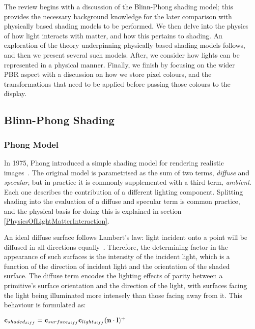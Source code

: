 The review begins with a discussion of the Blinn-Phong shading model; this provides the necessary background knowledge for the later comparison with physically based shading models to be performed. We then delve into the physics of how light interacts with matter, and how this pertains to shading. An exploration of the theory underpinning physically based shading models follows, and then we present several such models. After, we consider how lights can be represented in a physical manner. Finally, we finish by focusing on the wider PBR aspect with a discussion on how we store pixel colours, and the transformations that need to be applied before passing those colours to the display.

\subsection{Blinn-Phong Shading}

\subsubsection{Phong Model}

In 1975, Phong introduced a simple shading model for rendering realistic images~\cite{PhongShading}. The original model is parametrised as the sum of two terms, \textit{diffuse} and \textit{specular}, but in practice it is commonly supplemented with a third term, \textit{ambient}. Each one describes the contribution of a different lighting component. Splitting shading into the evaluation of a diffuse and specular term is common practice, and the physical basis for doing this is explained in section \ref{PhysicsOfLightMatterInteraction}.

An ideal diffuse surface follows Lambert's law: light incident onto a point will be diffused in all directions equally~\cite{Lambert}. Therefore, the determining factor in the appearance of such surfaces is the intensity of the incident light, which is a function of the direction of incident light and the orientation of the shaded surface. The diffuse term encodes the lighting effects of parity between a primitive's surface orientation and the direction of the light, with surfaces facing the light being illuminated more intensely than those facing away from it. This behaviour is formulated as:

\begin{center}
	\begin{math}\mathbf{c}_{shaded_{diff}} = \mathbf{c}_{surface_{diff}}\mathbf{c}_{light_{diff}}(\mathbf{n}\cdot\mathbf{l})^+\end{math}
\end{center}

